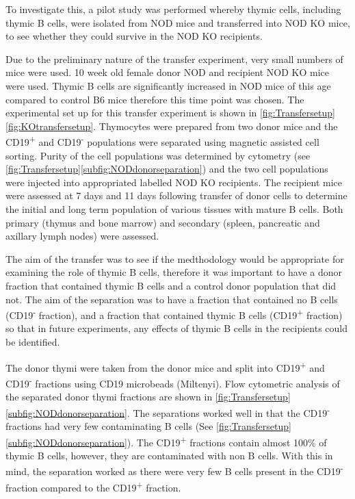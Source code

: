 To investigate this, a pilot study was performed whereby thymic cells, including thymic B cells, were isolated from NOD mice and transferred into NOD KO mice, to see whether they could survive in the NOD KO recipients.

Due to the preliminary nature of the transfer experiment, very small numbers of mice were used.
10 week old female donor NOD and recipient NOD KO mice were used.
Thymic B cells are significantly increased in NOD mice of this age compared to control B6 mice therefore this time point was chosen.
The experimental set up for this transfer experiment is shown in \cref{fig:Transfersetup}\ref{fig:KOtransfersetup}.
Thymocytes were prepared from two donor mice and the CD19\textsuperscript{+} and CD19\textsuperscript{-} populations were separated using magnetic assisted cell sorting. 
Purity of the cell populations was determined by cytometry (see \cref{fig:Transfersetup}\ref{subfig:NODdonorseparation}) and the two cell populations were injected into appropriated labelled NOD KO recipients.
The recipient mice were assessed at 7 days and 11 days following transfer of donor cells to determine the initial and long term population of various tissues with mature B cells.
Both primary (thymus and bone marrow) and secondary (spleen, pancreatic and axillary lymph nodes) were assessed.



The aim of the transfer was to see if the medthodology would be appropriate for examining the role of thymic B cells, therefore it was important to have a donor fraction that contained thymic B cells and a control donor population that did not.
The aim of the separation was to have a fraction that contained no B cells (CD19\textsuperscript{-} fraction), and a fraction that contained thymic B cells (CD19\textsuperscript{+} fraction) so that in future experiments, any effects of thymic B cells in the recipients could be identified.

The donor thymi were taken from the donor mice and split into CD19\textsuperscript{+} and CD19\textsuperscript{-} fractions using CD19 microbeads (Miltenyi).
Flow cytometric analysis of the separated donor thymi fractions are shown in \cref{fig:Transfersetup}\ref{subfig:NODdonorseparation}. %
The separations worked well in that the CD19\textsuperscript{-} fractions had very few contaminating B cells (See \cref{fig:Transfersetup}\ref{subfig:NODdonorseparation}).
The CD19\textsuperscript{+} fractions contain almost 100\% of thymic B cells, however, they are contaminated with non B cells.
With this in mind, the separation worked as there were very few B cells present in the CD19\textsuperscript{-} fraction compared to the CD19\textsuperscript{+} fraction.


